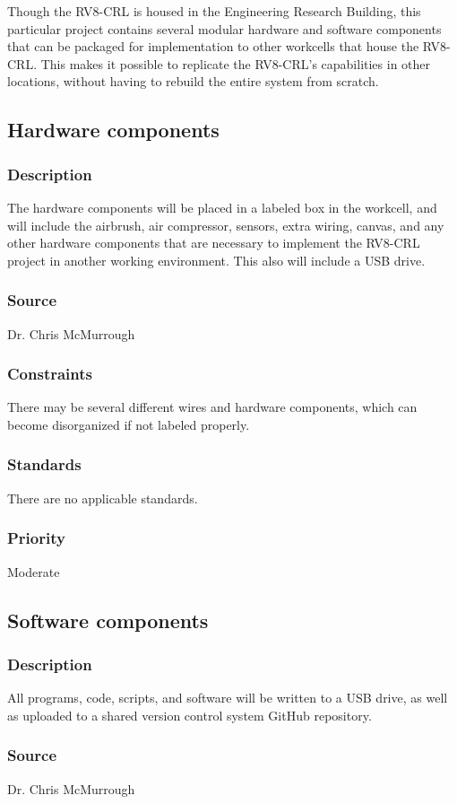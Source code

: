 Though the RV8-CRL is housed in the Engineering Research Building, this particular project contains several modular hardware and software components that can be packaged for implementation to other workcells that house the RV8-CRL. This makes it possible to replicate the RV8-CRL's capabilities in other locations, without having to rebuild the entire system from scratch.

\subsection{Hardware components}
\subsubsection{Description}
The hardware components will be placed in a labeled box in the workcell, and will include the airbrush, air compressor, sensors, extra wiring, canvas, and any other hardware components that are necessary to implement the RV8-CRL project in another working environment. This also will include a USB drive.
\subsubsection{Source}
Dr. Chris McMurrough
\subsubsection{Constraints}
There may be several different wires and hardware components, which can become disorganized if not labeled properly.
\subsubsection{Standards}
There are no applicable standards.
\subsubsection{Priority}
Moderate

\subsection{Software components}
\subsubsection{Description}
All programs, code, scripts, and software will be written to a USB drive, as well as uploaded to a shared version control system GitHub repository.
\subsubsection{Source}
Dr. Chris McMurrough
